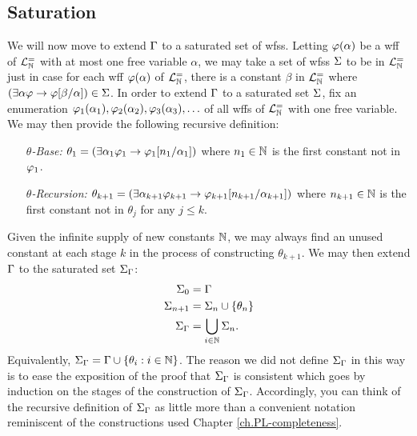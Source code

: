 \subsection{Saturation}%
  \label{sub:Saturation}

We will now move to extend $\Gamma$ to a saturated set of wfss.
Letting $\varphi(\alpha)$ be a wff of $\mathcal{L}^{=}_{\mathbb{N}}$ with at most one free variable $\alpha$, we may take a set of wfss $\Sigma$ to be  in $\mathcal{L}^{=}_{\mathbb{N}}$ just in case for each wff $\varphi(\alpha)$ of $\mathcal{L}^{=}_{\mathbb{N}}$, there is a constant $\beta$ in $\mathcal{L}^{=}_{\mathbb{N}}$ where $(\exists \alpha\varphi \rightarrow \varphi[\beta/\alpha])\in\Sigma$.
In order to extend $\Gamma$ to a saturated set $\Sigma$, fix an enumeration $\varphi_1(\alpha_1),\varphi_2(\alpha_2),\varphi_3(\alpha_3),\ldots$ of all wffs of $\mathcal{L}^{=}_{\mathbb{N}}$ with one free variable. %
We may then provide the following recursive definition:
\begin{enumerate}[leftmargin=1in]
  \item[\it $\theta$-Base:] $\theta_1=(\exists \alpha_1\varphi_1\rightarrow \varphi_1[n_1/\alpha_1])$ where $n_1\in\mathbb{N}$ is the first constant not in $\varphi_1$.
  \item[\it $\theta$-Recursion:] $\theta_{k+1}=(\exists \alpha_{k+1}\varphi_{k+1}\rightarrow \varphi_{k+1}[n_{k+1}/\alpha_{k+1}])$  where $n_{k+1}\in\mathbb{N}$ is the first constant not in $\theta_j$ for any $j\leq k$.
\end{enumerate}
Given the infinite supply of new constants $\mathbb{N}$, we may always find an unused constant at each stage $k$ in the process of constructing $\theta_{k+1}$.
We may then extend $\Gamma$ to the saturated set $\Sigma_{\Gamma}$:
\begin{align*}
  \label{name}
  \Sigma_0     &= \Gamma\\
  \Sigma_{n+1} &= \Sigma_n\cup\lbrace\theta_n\rbrace\\
  \Sigma_{\Gamma} &= \bigcup_{i\in\mathbb{N}}\Sigma_n.
\end{align*}
Equivalently, $\Sigma_{\Gamma}=\Gamma\cup\lbrace\theta_i:i\in\mathbb{N}\rbrace$.
The reason we did not define $\Sigma_{\Gamma}$ in this way is to ease the exposition of the proof that $\Sigma_{\Gamma}$ is consistent which goes by induction on the stages of the construction of $\Sigma_{\Gamma}$. 
Accordingly, you can think of the recursive definition of $\Sigma_{\Gamma}$ as little more than a convenient notation reminiscent of the constructions used Chapter \ref{ch.PL-completeness}.

